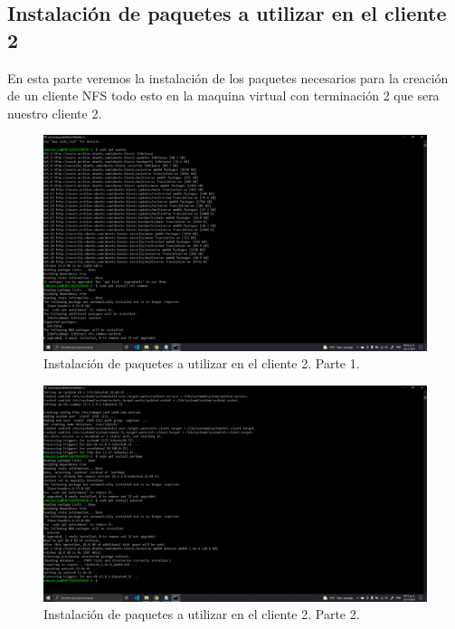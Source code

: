 \documentclass[11pt]{article}
\begin{document}
		\subsection{Instalación de paquetes a utilizar en el cliente 2}
		En esta parte veremos la instalación de los paquetes necesarios para la creación de un cliente NFS todo esto en la maquina virtual con terminación 2 que sera nuestro cliente 2.
		\begin{figure}[H]
			\centering
			\includegraphics[scale=0.34]{resources/instalandocliente2.1.png}
			\caption{Instalación de paquetes a utilizar en el cliente 2. Parte 1.}\label{fig:picture}
		\end{figure}
		\begin{figure}[H]
			\centering
			\includegraphics[scale=0.34]{resources/instalandocliente2.2.png}
			\caption{Instalación de paquetes a utilizar en el cliente 2. Parte 2.}\label{fig:picture}
		\end{figure}
\end{document}
